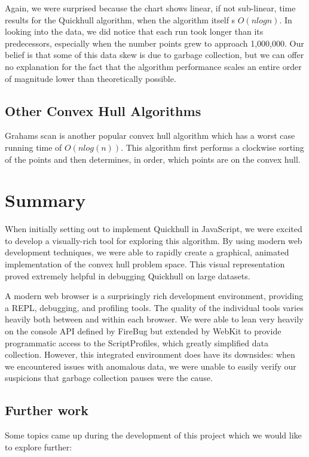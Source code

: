 \documentclass[11pt]{article}
\begin{document}
Again, we were surprised because the chart shows linear, if not sub-linear, time results for the Quickhull algorithm, when the algorithm itself s $O(n log n)$. In looking into the data, we did notice that each run took longer than its predecessors, especially when the number points grew to approach 1,000,000. Our belief is that some of this data skew is due to garbage collection, but we can offer no explanation for the fact that the algorithm performance scales an entire order of magnitude lower than theoretically possible.

\subsection{Other Convex Hull Algorithms}
Grahams scan is another popular convex hull algorithm which has a worst case running time of $O(nlog(n))$. This algorithm first performs a clockwise sorting of the points and then determines, in order, which points are on the convex hull.

\section{Summary}
When initially setting out to implement Quickhull in JavaScript, we were excited to develop a visually-rich tool for exploring this algorithm. By using modern web development techniques, we were able to rapidly create a graphical, animated implementation of the convex hull problem space. This visual representation proved extremely helpful in debugging Quickhull on large datasets.

A modern web browser is a surprisingly rich development environment, providing a REPL, debugging, and profiling tools. The quality of the individual tools varies heavily both between and within each browser. We were able to lean very heavily on the console API defined by FireBug but extended by WebKit to provide programmatic access to the ScriptProfiles, which greatly simplified data collection. However, this integrated environment does have its downsides: when we encountered issues with anomalous data, we were unable to easily verify our suspicions that garbage collection pauses were the cause.

\subsection{Further work}
Some topics came up during the development of this project which we would like to explore further:
\end{document}
